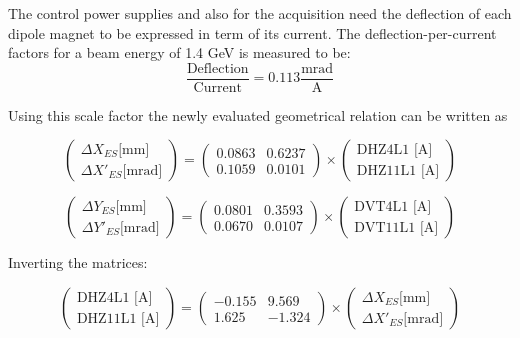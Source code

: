 \documentclass[11pt,letter,english]{article}
\begin{document}
The control power supplies and also for the acquisition need the deflection of
each dipole magnet to be expressed in term of its current.
The deflection-per-current factors for a beam energy of 1.4 GeV is measured to be:
\begin{equation}
\frac{\mbox{Deflection}}{\mbox{Current}} = 0.113 \frac{\mbox{mrad}}{\mbox{A}}
\end{equation}

Using this scale factor the newly evaluated geometrical relation can be written as 

\begin{equation}
\left( \begin{array}{c}
\Delta X_{ES}  \mbox{[mm]}   \\
\Delta X'_{ES} \mbox{[mrad]} \end{array} \right) 
=
\left( \begin{array}{cc}
0.0863 & 0.6237   \\
0.1059 & 0.0101  \end{array} \right) 
\times
\left( \begin{array}{c}
\mbox{DHZ4L1 [A]}   \\
\mbox{DHZ11L1 [A]}  \end{array} \right) 
\end{equation}

\begin{equation}
\left( \begin{array}{c}
\Delta Y_{ES}  \mbox{[mm]}   \\
\Delta Y'_{ES} \mbox{[mrad]} \end{array} \right) 
=
\left( \begin{array}{cc}
0.0801 & 0.3593  \\
0.0670 & 0.0107 \end{array} \right) 
\times
\left( \begin{array}{c}
\mbox{DVT4L1 [A]}   \\
\mbox{DVT11L1 [A]}  \end{array} \right) 
\end{equation}


Inverting the matrices:

\begin{equation}
\left( \begin{array}{c}
\mbox{DHZ4L1 [A]}   \\
\mbox{DHZ11L1 [A]}  \end{array} \right) 
=
\left( \begin{array}{cc}
-0.155  &  9.569    \\
 1.625  & -1.324    \end{array} \right) 
\times
\left( \begin{array}{c}
\Delta X_{ES}  \mbox{[mm]}   \\
\Delta X'_{ES} \mbox{[mrad]} \end{array} \right) 
\end{equation}
\end{document}
